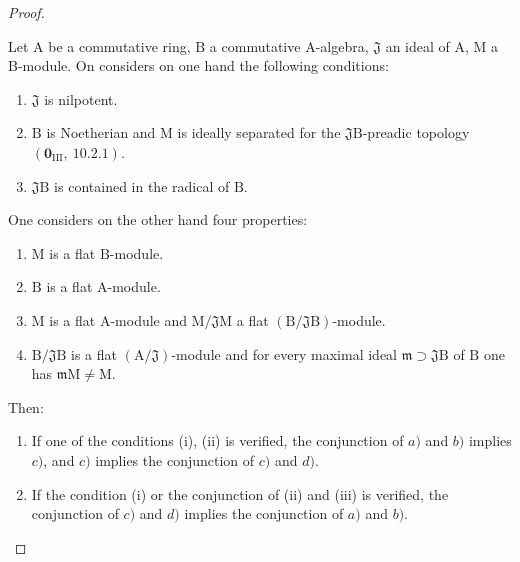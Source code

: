 \begin{proof}
\begin{lemma}[11.3.10.2]
\label{IV.11.3.10.2}
Let $\mathrm{A}$ be a commutative ring, $\mathrm{B}$ a commutative $\mathrm{A}$-algebra, $\mathfrak{J}$ an ideal of $\mathrm{A}$, $\mathrm{M}$ a $\mathrm{B}$-module. On considers on one hand the following conditions:
\begin{enumerate}[label=\emph{(\roman*)}]
  \item $\mathfrak{J}$ is nilpotent.
  \item $\mathrm{B}$ is Noetherian and $\mathrm{M}$ is ideally separated for the $\mathfrak{J}\mathrm{B}$-preadic topology $(\mathbf{0}_{\mathrm{III}},~10.2.1)$.
  \item $\mathfrak{J}\mathrm{B}$ is contained in the radical of $\mathrm{B}$.
\end{enumerate}
One considers on the other hand four properties:
\begin{enumerate}[label=\emph{\alph*)}]
  \item $\mathrm{M}$ is a flat $\mathrm{B}$-module.
  \item $\mathrm{B}$ is a flat $\mathrm{A}$-module.
  \item $\mathrm{M}$ is a flat $\mathrm{A}$-module and $\mathrm{M}/\mathfrak{J}\mathrm{M}$ a flat $(\mathrm{B}/\mathfrak{J}\mathrm{B})$-module.
  \item $\mathrm{B}/\mathfrak{J}\mathrm{B}$ is a flat $(\mathrm{A}/\mathfrak{J})$-module and for every maximal ideal $\mathfrak{m}\supset\mathfrak{J}\mathrm{B}$ of $\mathrm{B}$ one has $\mathfrak{m}\mathrm{M}\neq\mathrm{M}$.
\end{enumerate}
Then:
\begin{enumerate}[label=\arabic{enumi}\textsuperscript{o}]
  \item If one of the conditions (i), (ii) is verified, the conjunction of $a)$ and $b)$ implies $c)$, and $c)$ implies the conjunction of $c)$ and $d)$.
  \item {} If the condition (i) or the conjunction of (ii) and (iii) is verified, the conjunction of $c)$ and $d)$ implies the conjunction of $a)$ and $b)$.
\end{enumerate}
\end{lemma}


\end{proof}
